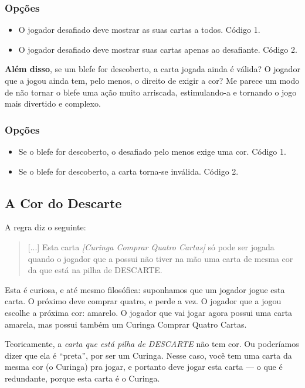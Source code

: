 \subsubsection{Opções}

\begin{itemize}
\item{O jogador desafiado deve mostrar as suas cartas a todos. Código 1.}
\item{O jogador desafiado deve mostrar suas cartas apenas ao desafiante. Código 2.}
\end{itemize} 

\textbf{Além disso}, se um blefe for descoberto, a carta jogada ainda é válida? O jogador que a jogou ainda tem, pelo menos, o direito de exigir a cor? Me parece um modo de não tornar o blefe uma ação muito arriscada, estimulando-a e tornando o jogo mais divertido e complexo.

\subsubsection{Opções}

\begin{itemize}
\item{Se o blefe for descoberto, o desafiado pelo menos exige uma cor. Código 1.}
\item{Se o blefe for descoberto, a carta torna-se inválida. Código 2.}
\end{itemize}

\subsection{A Cor do Descarte}

A regra diz o seguinte:

\begin{quote}
[...] Esta carta \textit{[Curinga Comprar Quatro Cartas]} só pode ser jogada quando o jogador que a possui não tiver na mão uma carta de mesma cor da que está na pilha de DESCARTE.
\end{quote}

Esta é curiosa, e até mesmo filosófica: suponhamos que um jogador jogue esta carta. O próximo deve comprar quatro, e perde a vez. O jogador que a jogou escolhe a próxima cor: amarelo. O jogador que vai jogar agora possui uma carta amarela, mas possui também um Curinga Comprar Quatro Cartas.

Teoricamente, a \textit{carta que está pilha de DESCARTE} não tem cor. Ou poderíamos dizer que ela é ``preta'', por ser um Curinga. Nesse caso, você tem uma carta da mesma cor (o Curinga) pra jogar, e portanto deve jogar esta carta --- o que é redundante, porque esta carta é o Curinga.

